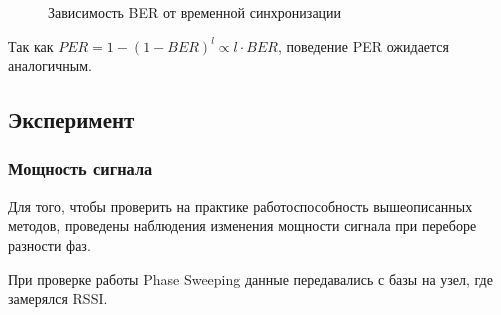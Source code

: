 \documentclass[a4paper,12pt,oneside, abstract=true]{scrartcl}
\begin{document}
\begin{enumerate}
\begin{enumerate}
\begin{figure}[!h]
\caption{Зависимость BER от временной синхронизации}
\label{fig:BERtiming}
\end{figure}
\FloatBarrier
Так как \mbox{$PER = 1-\left(1-BER\right)^l\propto l\cdot BER$}, поведение PER ожидается аналогичным.
\end{enumerate}
\end{enumerate}

\subsection{Эксперимент}
\subsubsection{Мощность сигнала}
Для того, чтобы проверить на практике работоспособность вышеописанных методов, проведены наблюдения изменения мощности сигнала при переборе разности фаз.

При проверке работы Phase Sweeping данные передавались с базы на узел, где замерялся RSSI. 

\end{document}

